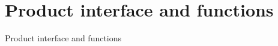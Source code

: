 \section{Product interface and functions}
\begin{frame}{Product interface and functions}

\end{frame}
